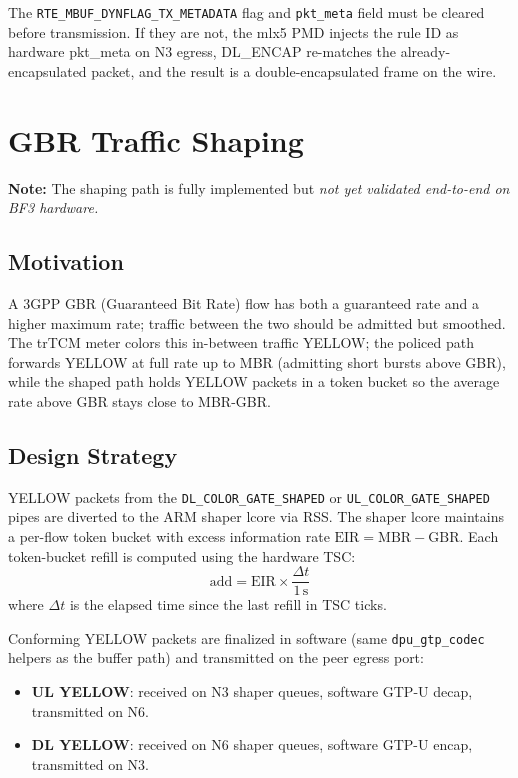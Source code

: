 \documentclass[conference]{IEEEtran}
\newcommand{\code}[1]{\nolinkurl{#1}}
\begin{document}
The \code{RTE_MBUF_DYNFLAG_TX_METADATA} flag and \texttt{pkt\_meta}
field must be cleared before transmission.  If they are not, the
mlx5 PMD injects the rule ID as hardware pkt\_meta on N3 egress,
DL\_ENCAP re-matches the already-encapsulated packet, and the result
is a double-encapsulated frame on the wire.

\section{GBR Traffic Shaping}
\label{sec:shaping}

\textbf{Note:} The shaping path is fully implemented but \emph{not yet
validated end-to-end on BF3 hardware.}

\subsection{Motivation}

A 3GPP GBR (Guaranteed Bit Rate) flow has both a guaranteed rate and
a higher maximum rate; traffic between the two should be admitted but
smoothed.  The trTCM meter colors this in-between traffic YELLOW; the
policed path forwards YELLOW at full rate up to MBR (admitting short
bursts above GBR), while the shaped path holds YELLOW packets in a
token bucket so the average rate above GBR stays close to MBR-GBR.

\subsection{Design Strategy}

YELLOW packets from the \code{DL_COLOR_GATE_SHAPED} or
\code{UL_COLOR_GATE_SHAPED} pipes are diverted to the ARM shaper lcore
via RSS.  The shaper lcore maintains a per-flow token bucket with excess
information rate $\text{EIR} = \text{MBR} - \text{GBR}$.  Each token-bucket
refill is computed using the hardware TSC:
\begin{equation}
  \text{add} = \text{EIR} \times \frac{\Delta t}{1\,\text{s}}
\end{equation}
where $\Delta t$ is the elapsed time since the last refill in TSC ticks.

Conforming YELLOW packets are finalized in software (same
\code{dpu_gtp_codec} helpers as the buffer path) and transmitted on the
peer egress port:

\begin{itemize}
  \item \textbf{UL YELLOW}: received on N3 shaper queues, software
        GTP-U decap, transmitted on N6.
  \item \textbf{DL YELLOW}: received on N6 shaper queues, software
        GTP-U encap, transmitted on N3.
\end{itemize}
\end{document}

